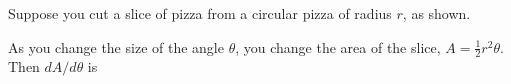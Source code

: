 \documentclass{ximera}
\begin{document}
\begin{problem}

  Suppose you cut a slice of pizza from a circular pizza of radius
  $r$, as shown.
  \begin{image}
  \end{image}
  As you change the size of the angle $\theta$, you change the area of
  the slice, $A=\frac{1}{2}r^2\theta$. Then $dA/d\theta$ is
  \begin{multipleChoice}
  \end{multipleChoice}
\end{problem}
\end{document}
